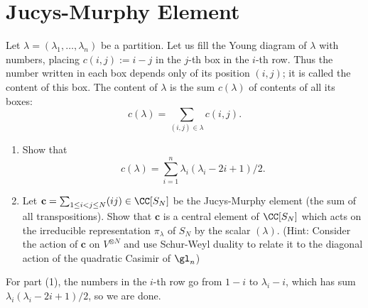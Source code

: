 \documentclass[11pt, headheight=30pt]{scrartcl}
\begin{document}
\section{Jucys-Murphy Element}
\begin{prob*}
    Let $\lambda = (\lambda_1, \ldots, \lambda_n)$ be a partition. Let us fill the Young diagram of $\lambda$ with numbers, placing $c(i, j) := i - j$ in the $j$-th box in the $i$-th row. Thus the number written in each box depends only of its position $(i, j)$; it is called the content of this box. The content of $\lambda$ is the sum $c(\lambda)$ of contents of all its boxes:
    \[
        c(\lambda) = \sum_{(i,j)\in \lambda} c(i, j).
    \]
    \begin{enumerate}
        \item Show that
        \[
            c(\lambda) = \sum_{i=1}^n \lambda_i(\lambda_i - 2i + 1)/2.
        \]
        \item Let $\mathbf{c} = \sum_{1\leq i < j \leq N} (ij) \in \CC[S_N]$ be the Jucys-Murphy element (the sum of all transpositions). Show that $\mathbf{c}$ is a central element of $\CC[S_N]$ which acts on the irreducible representation $\pi_\lambda$ of $S_N$ by the scalar $(\lambda)$. (Hint: Consider the action of $\mathbf{c}$ on $V^{\otimes N}$ and use Schur-Weyl duality to relate it to the diagonal action of the quadratic Casimir of $\gl_n$)
    \end{enumerate}
\end{prob*}

For part (1), the numbers in the $i$-th row go from $1-i$ to $\lambda_i - i$, which has sum $\lambda_i(\lambda_i - 2i + 1)/2$, so we are done.
\end{document}

